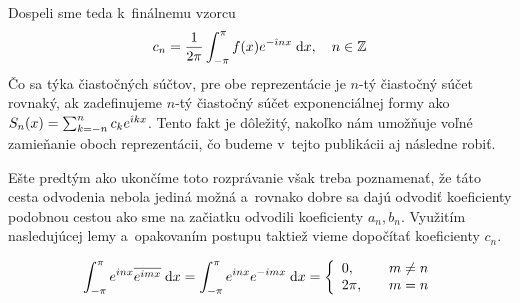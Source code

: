 Dospeli sme teda k~finálnemu vzorcu
\begin{equation}
    c_n = \frac{1}{2\pi} \int_{-\pi}^{\pi} f(x) e^{-\hat{\imath} n x} \; \mathrm{d} x, 
        \quad n\in \mathbb{Z}
    \label{eq:fourierove_exp_koeficienty}
\end{equation}
Čo sa týka čiastočných súčtov, pre obe reprezentácie je $n$-tý
čiastočný súčet rovnaký, ak zadefinujeme $n$-tý čiastočný súčet
exponenciálnej formy ako $S_n(x) = \sum_{k=-n}^{n} c_k e^{\hat{\imath} k
x}$. Tento fakt je dôležitý, nakoľko nám umožňuje voľné zamieňanie
oboch reprezentácii, čo budeme v~tejto publikácii aj následne robiť.

Ešte predtým ako ukončíme toto rozprávanie však treba poznamenať, že
táto cesta odvodenia nebola jediná možná a~rovnako dobre sa dajú
odvodiť koeficienty podobnou cestou ako sme na začiatku odvodili
koeficienty $a_n,b_n$. Využitím nasledujúcej lemy a~opakovaním postupu
taktiež vieme dopočítať koeficienty $c_n$.
\begin{lema}
    \begin{equation*}
    \int_{-\pi}^{\pi} e^{i n x} \overline{e^{i m x}} \; \mathrm{d} x = 
    \int_{-\pi}^{\pi} e^{i n x} e^{-i m x} \; \mathrm{d} x = 
    \left\{
        \begin{array}{l l}
            0,& \quad m\not=n \\
            2\pi,& \quad m=n            
        \end{array}
        \right.
    \end{equation*}
\end{lema}
